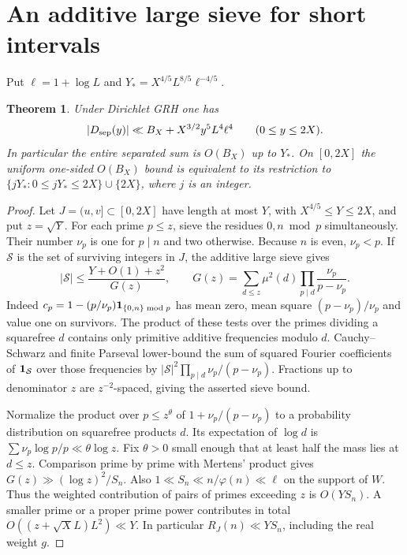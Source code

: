 \documentclass[11pt,a4paper]{article}
\newtheorem{theorem}{Theorem}[section]\newtheorem{prop}[theorem]{Proposition}
\begin{document}
\section{An additive large sieve for short intervals}\label{s:sieve}
Put \(\ell=1+\log L\) and \(Y_*=X^{4/5}L^{8/5}\ell^{-4/5}\).
\begin{theorem}\label{t:short}
Under Dirichlet GRH one has
\[
 |D_{{\mathrm{sep}}}(y)|\ll B_X+X^{3/2}y^5L^4\ell^4\qquad(0\le y\le2X).
\]
In particular the entire separated sum is \(O(B_X)\) up to \(Y_*\).
On \([0,2X]\) the uniform one-sided \(O(B_X)\) bound is equivalent to its restriction to \(\{jY_*:0\le jY_*\le2X\}\cup\{2X\}\), where \(j\) is an integer.
\end{theorem}
\begin{proof}
Let \(J=(u,v]\subset[0,2X]\) have length at most \(Y\), with \(X^{4/5}\le Y\le2X\), and put \(z=\sqrt Y\). For each prime \(p\le z\), sieve the residues \(0,n\bmod p\) simultaneously. Their number \(\nu_p\) is one for \(p\mid n\) and two otherwise. Because \(n\) is even, \(\nu_p<p\). If \(\mathcal S\) is the set of surviving integers in \(J\), the additive large sieve \cite{MV} gives
\[
 |\mathcal S|\le\frac{Y+O(1)+z^2}{G(z)},\qquad
 G(z)=\sum_{d\le z}\mu^2(d)\prod_{p\mid d}\frac{\nu_p}{p-\nu_p}.
\]
Indeed \(c_p=1-(p/\nu_p)\mathbf1_{\{0,n\}\bmod p}\) has mean zero, mean square \((p-\nu_p)/\nu_p\) and value one on survivors. The product of these tests over the primes dividing a squarefree \(d\) contains only primitive additive frequencies modulo \(d\). Cauchy--Schwarz and finite Parseval lower-bound the sum of squared Fourier coefficients of \(\mathbf1_{\mathcal S}\) over those frequencies by \(|\mathcal S|^2\prod_{p\mid d}\nu_p/(p-\nu_p)\). Fractions up to denominator \(z\) are \(z^{-2}\)-spaced, giving the asserted sieve bound.

Normalize the product over \(p\le z^\theta\) of \(1+\nu_p/(p-\nu_p)\) to a probability distribution on squarefree products \(d\). Its expectation of \(\log d\) is \(\sum\nu_p\log p/p\ll\theta\log z\). Fix \(\theta>0\) small enough that at least half the mass lies at \(d\le z\). Comparison prime by prime with Mertens' product gives \(G(z)\gg(\log z)^2/S_n\). Also \(1\ll S_n\ll n/\varphi(n)\ll\ell\) on the support of \(W\). Thus the weighted contribution of pairs of primes exceeding \(z\) is \(O(YS_n)\). A smaller prime or a proper prime power contributes in total \(O((z+\sqrt X L)L^2)\ll Y\). In particular \(R_J(n)\ll Y S_n\), including the real weight \(g\).


\end{proof}
\end{document}
